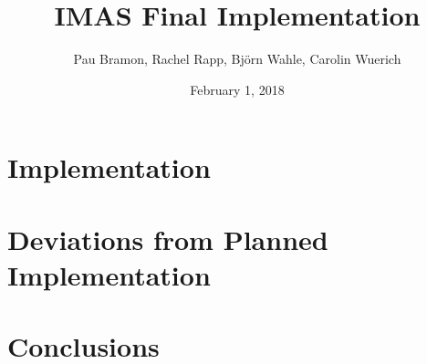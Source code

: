 \documentclass[11pt]{article}
\title{IMAS Final Implementation}
\begin{document}
\date{February 1, 2018}
\author{Pau Bramon, Rachel Rapp, Bj\"{o}rn Wahle, Carolin Wuerich}

\maketitle

\begin{abstract}	
	


\end{abstract}

\section{Implementation}\label{sec_implementation}




\section{Deviations from Planned Implementation}\label{sec_differences}



\section{Conclusions}\label{sec_conclusions}


\end{document}
